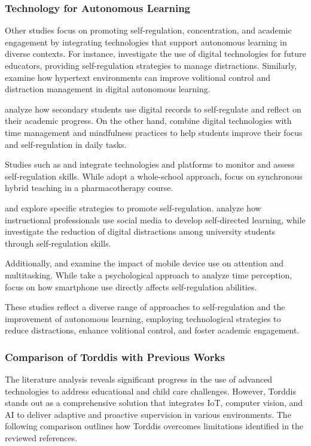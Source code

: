 		\subsubsection{Technology for Autonomous Learning}
			Other studies focus on promoting self-regulation, concentration, and academic engagement by integrating technologies that support autonomous learning in diverse contexts. For instance, \cite{Bembich2016Future} investigate the use of digital technologies for future educators, providing self-regulation strategies to manage distractions. Similarly, \cite{Peters2003Self} examine how hypertext environments can improve volitional control and distraction management in digital autonomous learning.
			
			\cite{Roberts2020Task} analyze how secondary students use digital records to self-regulate and reflect on their academic progress. On the other hand, \cite{Adcroft2018Developing} combine digital technologies with time management and mindfulness practices to help students improve their focus and self-regulation in daily tasks.
			
			Studies such as \cite{Salter2014Exploring} and \cite{Palmer2022impact} integrate technologies and platforms to monitor and assess self-regulation skills. While \cite{Salter2014Exploring} adopt a whole-school approach, \cite{Palmer2022impact} focus on synchronous hybrid teaching in a pharmacotherapy course.
			
			\cite{Muljana2022Instructional} and \cite{Wang2022Empowering} explore specific strategies to promote self-regulation. \cite{Muljana2022Instructional} analyze how instructional professionals use social media to develop self-directed learning, while \cite{Wang2022Empowering} investigate the reduction of digital distractions among university students through self-regulation skills.
			
			Additionally, \cite{Hartley2022Smartphone} and \cite{Labar2019Interplay} examine the impact of mobile device use on attention and multitasking. While \cite{Labar2019Interplay} take a psychological approach to analyze time perception, \cite{Hartley2022Smartphone} focus on how smartphone use directly affects self-regulation abilities.
			
			These studies reflect a diverse range of approaches to self-regulation and the improvement of autonomous learning, employing technological strategies to reduce distractions, enhance volitional control, and foster academic engagement.
			
		\subsubsection{Comparison of Torddis with Previous Works}
			The literature analysis reveals significant progress in the use of advanced technologies to address educational and child care challenges. However, Torddis stands out as a comprehensive solution that integrates IoT, computer vision, and AI to deliver adaptive and proactive supervision in various environments. The following comparison outlines how Torddis overcomes limitations identified in the reviewed references.
			
